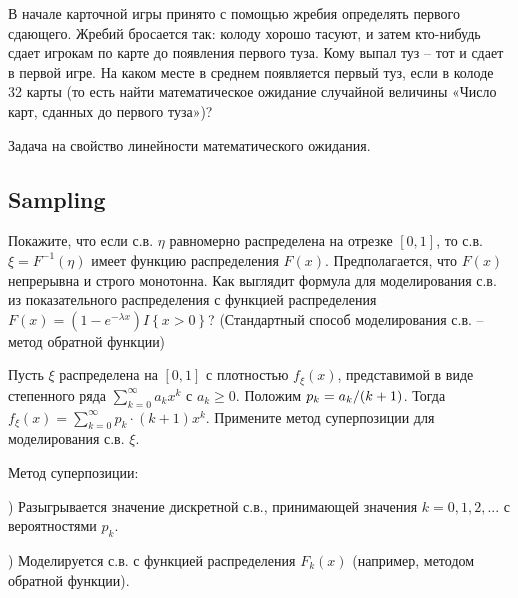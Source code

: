 \begin{problem}
В начале карточной игры принято с помощью жребия определять первого сдающего. Жребий бросается так: колоду хорошо тасуют, и затем кто-нибудь сдает игрокам по карте до появления первого туза. Кому выпал туз -- тот и сдает в первой игре. На каком месте в среднем появляется первый туз, если в колоде 32 карты (то есть найти математическое ожидание случайной величины «Число карт, сданных до первого туза»)?

\begin{ordre} 
Задача на свойство линейности математического ожидания.
\end{ordre}

\end{problem}

\subsection{Sampling}

\begin{problem}
Покажите, что если с.в. $\eta $ равномерно распределена на отрезке $\left[0,1\right]$, то с.в. $\xi =F^{-1} \left(\eta \right)$ имеет функцию распределения $F\left(x\right)$. Предполагается, что $F\left(x\right)$ непрерывна и строго монотонна. Как выглядит формула для моделирования с.в. из показательного распределения с функцией распределения $F\left(x\right)=\left(1-e^{-\lambda x} \right)I\left\{x>0\right\}$? (Стандартный способ моделирования с.в. -- метод обратной функции)
\end{problem}

\begin{problem}

Пусть $\xi $ распределена на $\left[0,1\right]$ с плотностью $f_{\xi } (x)$, представимой в виде степенного ряда $\sum _{k=0}^{\infty }a_{k} x^{k}  $ с $a_{k} \ge 0$. Положим $p_{k} ={a_{k} \mathord{\left/ {\vphantom {a_{k}  (k+1)}} \right. \kern-\nulldelimiterspace} (k+1)} $. Тогда $f_{\xi } (x)=\sum _{k=0}^{\infty }p_{k} \cdot (k+1)x^{k}  $. Примените метод суперпозиции для моделирования с.в. $\xi $.

\begin{ordre}
Метод суперпозиции:

) Разыгрывается значение дискретной с.в., принимающей значения $k=0,1,2,...$ с вероятностями $p_{k} $.

) Моделируется с.в. с функцией распределения $F_{k} (x)$ (например, методом обратной функции).

\end{ordre}

\end{problem}

